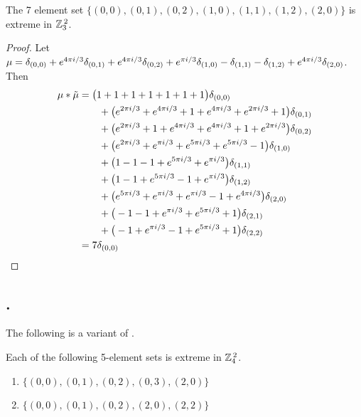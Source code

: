 \begin{prop}\label{prop7inZ3.X.Z3}
The 7 element set $\{(0, 0),  (0, 1),  (0, 2),  (1, 0),  (1, 1),  (1, 2),  (2, 0) \}$ is extreme in $\texttt{$\mathbb Z_{3}^{\,2}$}$. \newline \end{prop} 


 
\begin{proof}
Let  $\mu =  \delta_{(0,0)}+e^{4\pi i/3}\delta_{(0,1)}+e^{4\pi i/3}\delta_{(0,2)}+e^{\pi i/3}\delta_{(1,0)}-\delta_{(1,1)}-\delta_{(1,2)}+e^{4\pi i/3}\delta_{(2,0)}
$.  Then 
\begin{align*} 
\mu * \tilde \mu & = \big(1+1+1+1+1+1+1\big)\delta_{(0,0)}
\\&\qquad
+\big(e^{2\pi i/3}+e^{4\pi i/3}+1+e^{4\pi i/3}+e^{2\pi i/3}+1\big)\delta_{(0,1)}
\\&\qquad
+\big(e^{2\pi i/3}+1+e^{4\pi i/3}+e^{4\pi i/3}+1+e^{2\pi i/3}\big)\delta_{(0,2)}
\\&\qquad
+\big(e^{2\pi i/3}+e^{\pi i/3}+e^{5\pi i/3}+e^{5\pi i/3}-1\big)\delta_{(1,0)}
\\&\qquad
+\big(1-1-1+e^{5\pi i/3}+e^{\pi i/3}\big)\delta_{(1,1)}
\\&\qquad
+\big(1-1+e^{5\pi i/3}-1+e^{\pi i/3}\big)\delta_{(1,2)}
\\&\qquad
+\big(e^{5\pi i/3}+e^{\pi i/3}+e^{\pi i/3}-1+e^{4\pi i/3}\big)\delta_{(2,0)}
\\&\qquad
+\big(-1-1+e^{\pi i/3}+e^{5\pi i/3}+1\big)\delta_{(2,1)}
\\&\qquad
+\big(-1+e^{\pi i/3}-1+e^{5\pi i/3}+1\big)\delta_{(2,2)}\\&=7\delta_{(0 , 0)}\qedhere
\end{align*}
\end{proof}



 
\subsection{.}

The following is a variant of 
\cite[3.3 (i) ]{MR627683}.

\begin{prop}\label{prop5inZ4.X.Z4}
Each of the following  5-element sets  is extreme in $  \texttt{$\mathbb Z_{4}^{\,2}$}$. 
\begin{enumerate}
\item $\{(0, 0),  (0, 1),  (0, 2),  (0, 3),  (2, 0) \}$
\item $\{(0, 0),  (0, 1),  (0, 2),  (2, 0),  (2, 2) \}$
\end{enumerate}
 \end{prop} 


